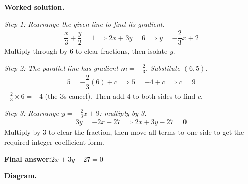 \documentclass[11pt]{article}
\begin{document}
\textbf{Worked solution.}

\textit{Step 1: Rearrange the given line to find its gradient.}
\[\begin{gathered}
\dfrac{x}{3} + \dfrac{y}{2} = 1 \implies 2x + 3y = 6 \implies y = -\dfrac{2}{3}x + 2
\end{gathered}\]
Multiply through by 6 to clear fractions, then isolate \( y \).

\textit{Step 2: The parallel line has gradient \( m = -\frac{2}{3} \). Substitute \( (6, 5) \).}
\[\begin{gathered}
5 = -\dfrac{2}{3}(6) + c \implies 5 = -4 + c \implies c = 9
\end{gathered}\]
\( -\tfrac{2}{3} \times 6 = -4 \) (the \( 3 \)s cancel). Then add \( 4 \) to both sides to find \( c \).

\textit{Step 3: Rearrange \( y = -\frac{2}{3}x + 9 \): multiply by 3.}
\[\begin{gathered}
3y = -2x + 27 \implies 2x + 3y - 27 = 0
\end{gathered}\]
Multiply by \( 3 \) to clear the fraction, then move all terms to one side to get the required integer-coefficient form.

\begin{answerbox}
\textbf{Final answer:}\quad \(\displaystyle 2x + 3y - 27 = 0\)
\end{answerbox}
\textbf{Diagram.}
\end{document}
